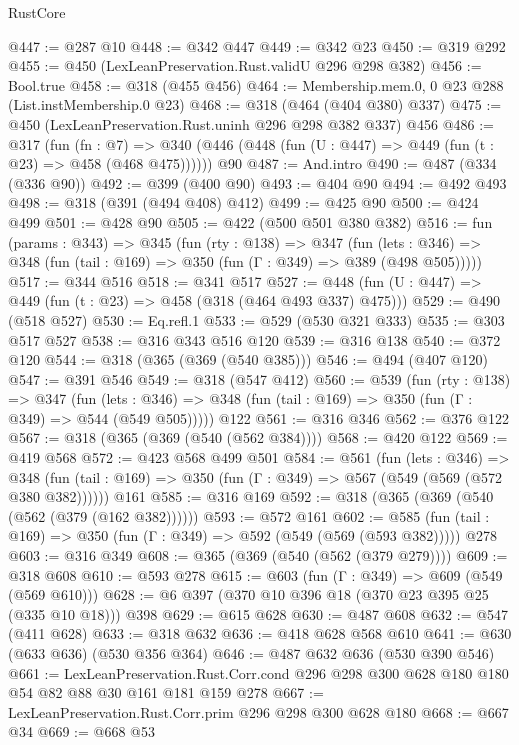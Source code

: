 \begin{lexlean}{RustCore}
\begin{coremodule}
@447 := @287 @10
@448 := @342 @447
@449 := @342 @23
@450 := @319 @292
@455 := @450 (LexLeanPreservation.Rust.validU @296 @298 @382)
@456 := Bool.true
@458 := @318 (@455 @456)
@464 := Membership.mem.{0, 0} @23 @288 (List.instMembership.{0} @23)
@468 := @318 (@464 (@404 @380) @337)
@475 := @450 (LexLeanPreservation.Rust.uninh @296 @298 @382 @337) @456
@486 := @317
    (fun (fn : @7) =>
    @340 (@446 (@448 (fun (U : @447) => @449 (fun (t : @23) => @458 (@468 @475))))))
    @90
@487 := And.intro
@490 := @487 (@334 (@336 @90))
@492 := @399 (@400 @90)
@493 := @404 @90
@494 := @492 @493
@498 := @318 (@391 (@494 @408) @412)
@499 := @425 @90
@500 := @424 @499
@501 := @428 @90
@505 := @422 (@500 @501 @380 @382)
@516 := fun (params : @343) =>
  @345
    (fun (rty : @138) =>
    @347
      (fun (lets : @346) => @348 (fun (tail : @169) => @350 (fun (Γ : @349) => @389 (@498 @505)))))
@517 := @344 @516
@518 := @341 @517
@527 := @448 (fun (U : @447) => @449 (fun (t : @23) => @458 (@318 (@464 @493 @337) @475)))
@529 := @490 (@518 @527)
@530 := Eq.refl.{1}
@533 := @529 (@530 @321 @333)
@535 := @303 @517 @527
@538 := @316 @343 @516 @120
@539 := @316 @138
@540 := @372 @120
@544 := @318 (@365 (@369 (@540 @385)))
@546 := @494 (@407 @120)
@547 := @391 @546
@549 := @318 (@547 @412)
@560 := @539
    (fun (rty : @138) =>
    @347
      (fun (lets : @346) => @348 (fun (tail : @169) => @350 (fun (Γ : @349) => @544 (@549 @505)))))
    @122
@561 := @316 @346
@562 := @376 @122
@567 := @318 (@365 (@369 (@540 (@562 @384))))
@568 := @420 @122
@569 := @419 @568
@572 := @423 @568 @499 @501
@584 := @561
    (fun (lets : @346) =>
    @348 (fun (tail : @169) => @350 (fun (Γ : @349) => @567 (@549 (@569 (@572 @380 @382))))))
    @161
@585 := @316 @169
@592 := @318 (@365 (@369 (@540 (@562 (@379 (@162 @382))))))
@593 := @572 @161
@602 := @585 (fun (tail : @169) => @350 (fun (Γ : @349) => @592 (@549 (@569 (@593 @382))))) @278
@603 := @316 @349
@608 := @365 (@369 (@540 (@562 (@379 @279))))
@609 := @318 @608
@610 := @593 @278
@615 := @603 (fun (Γ : @349) => @609 (@549 (@569 @610)))
@628 := @6 @397 (@370 @10 @396 @18 (@370 @23 @395 @25 (@335 @10 @18))) @398
@629 := @615 @628
@630 := @487 @608
@632 := @547 (@411 @628)
@633 := @318 @632
@636 := @418 @628 @568 @610
@641 := @630 (@633 @636) (@530 @356 @364)
@646 := @487 @632 @636 (@530 @390 @546)
@661 := LexLeanPreservation.Rust.Corr.cond
    @296
    @298
    @300
    @628
    @180
    @180
    @54
    @82
    @88
    @30
    @161
    @181
    @159
    @278
@667 := LexLeanPreservation.Rust.Corr.prim @296 @298 @300 @628 @180
@668 := @667 @34
@669 := @668 @53

\end{coremodule}
\end{lexlean}
